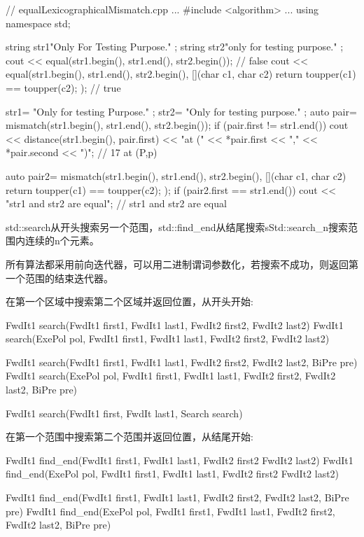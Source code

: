 \begin{cpp}
// equalLexicographicalMismatch.cpp
...
#include <algorithm>
...
using namespace std;

string str1{"Only For Testing Purpose." };
string str2{"only for testing purpose." };
cout << equal(str1.begin(), str1.end(), str2.begin()); // false
cout << equal(str1.begin(), str1.end(), str2.begin(),
			  [](char c1, char c2){ return toupper(c1) == toupper(c2);} );
																// true

str1= {"Only for testing Purpose." };
str2= {"Only for testing purpose." };
auto pair= mismatch(str1.begin(), str1.end(), str2.begin());
if (pair.first != str1.end()){
	cout << distance(str1.begin(), pair.first)
		 << "at (" << *pair.first << "," << *pair.second << ")"; // 17 at (P,p)
}

auto pair2= mismatch(str1.begin(), str1.end(), str2.begin(),
					 [](char c1, char c2){ return toupper(c1) == toupper(c2); });
if (pair2.first == str1.end()){
	cout << "str1 and str2 are equal"; // str1 and str2 are equal
}
\end{cpp}


std::search从开头搜索另一个范围，std::find\_end从结尾搜索sStd::search\_n搜索范围内连续的n个元素。

所有算法都采用前向迭代器，可以用二进制谓词参数化，若搜索不成功，则返回第一个范围的结束迭代器。

在第一个区域中搜索第二个区域并返回位置，从开头开始:

\begin{cpp}
FwdIt1 search(FwdIt1 first1, FwdIt1 last1, FwdIt2 first2, FwdIt2 last2)
FwdIt1 search(ExePol pol, FwdIt1 first1, FwdIt1 last1,
			  FwdIt2 first2, FwdIt2 last2)
			  
FwdIt1 search(FwdIt1 first1, FwdIt1 last1,
			  FwdIt2 first2, FwdIt2 last2, BiPre pre)
FwdIt1 search(ExePol pol, FwdIt1 first1, FwdIt1 last1,
			  FwdIt2 first2, FwdIt2 last2, BiPre pre)
			  
FwdIt1 search(FwdIt1 first, FwdIt last1, Search search)
\end{cpp}

在第一个范围中搜索第二个范围并返回位置，从结尾开始:

\begin{cpp}
FwdIt1 find_end(FwdIt1 first1, FwdIt1 last1, FwdIt2 first2 FwdIt2 last2)
FwdIt1 find_end(ExePol pol, FwdIt1 first1, FwdIt1 last1,
				FwdIt2 first2 FwdIt2 last2)
				
FwdIt1 find_end(FwdIt1 first1, FwdIt1 last1, FwdIt2 first2, FwdIt2 last2,
				BiPre pre)
FwdIt1 find_end(ExePol pol, FwdIt1 first1, FwdIt1 last1,
				FwdIt2 first2, FwdIt2 last2, BiPre pre)
\end{cpp}

